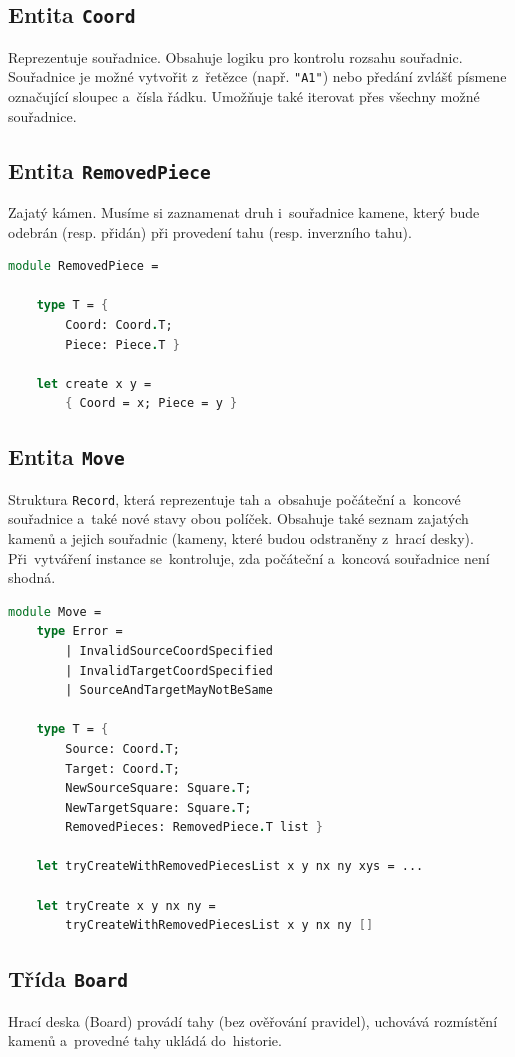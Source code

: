 \documentclass[12pt]{article}
\begin{document}
\subsection{Entita \texttt{Coord}}
Reprezentuje souřadnice. Obsahuje logiku pro kontrolu rozsahu souřadnic. Souřadnice je možné vytvořit z~řetězce (např. \texttt{"A1"}) nebo předání zvlášť písmene označující sloupec a~čísla řádku.
Umožňuje také iterovat přes všechny možné souřadnice.

\subsection{Entita \texttt{RemovedPiece}}
Zajatý kámen. Musíme si zaznamenat druh i~souřadnice kamene, který bude odebrán (resp. přidán) při provedení tahu (resp. inverzního tahu).
\begin{lstlisting}[language=FSharp]
module RemovedPiece =

    type T = {
        Coord: Coord.T;
        Piece: Piece.T }
    
    let create x y =
        { Coord = x; Piece = y }
\end{lstlisting}

\subsection{Entita \texttt{Move}}
Struktura \texttt{Record}, která reprezentuje tah a~obsahuje počáteční a~koncové souřadnice a~také nové stavy obou políček. Obsahuje také seznam zajatých kamenů a jejich souřadnic (kameny, které budou odstraněny z~hrací desky). Při~vytváření instance se~kontroluje, zda počáteční a~koncová souřadnice není shodná.
\begin{lstlisting}[language=FSharp]
module Move =
    type Error =
        | InvalidSourceCoordSpecified
        | InvalidTargetCoordSpecified
        | SourceAndTargetMayNotBeSame

    type T = {
        Source: Coord.T;
        Target: Coord.T;
        NewSourceSquare: Square.T;
        NewTargetSquare: Square.T;
        RemovedPieces: RemovedPiece.T list }

    let tryCreateWithRemovedPiecesList x y nx ny xys = ...

    let tryCreate x y nx ny =
        tryCreateWithRemovedPiecesList x y nx ny []
\end{lstlisting}

\subsection{Třída \texttt{Board}}
Hrací deska (Board) provádí tahy (bez ověřování pravidel), uchovává rozmístění kamenů a~provedné tahy ukládá do~historie.
\end{document}

